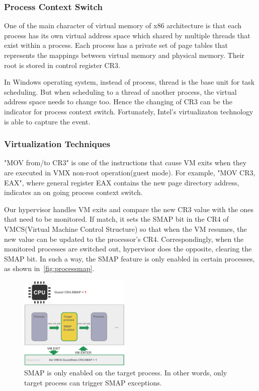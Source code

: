 \subsubsection{Process Context Switch}

One of the main character of virtual memory of x86 architecture is that each process has its own virtual address space which shared by multiple threads that exist within a process. Each process has a private set of page tables that represents the mappings between virtual memory and physical memory. Their root is stored in control register CR3. 

In Windows operating system, instead of process, thread is the base unit for task scheduling. But when scheduling to a thread of another process, the virtual address space needs to change too. Hence the changing of CR3 can be the indicator for process context switch. Fortunately, Intel's virtualizaton technology is able to capture the event.


\subsubsection{Virtualization Techniques}

"MOV from/to CR3" is one of the instructions that cause VM exits when they are executed in VMX non-root operation(guest mode). For example, "MOV CR3, EAX", where general register EAX contains the new page directory address, indicates an on going process context switch.

Our hypervisor handles VM exits and compare the new CR3 value with the ones that need to be monitored. If match, it sets the SMAP bit in the CR4 of VMCS(Virtual Machine Control Structure) so that when the VM resumes, the new value can be updated to the processor's CR4. Correspondingly, when the monitored processes are switched out, hypervisor does the opposite, clearing the SMAP bit. In such a way, the SMAP feature is only enabled in certain processes, as shown in~\autoref{fig:processmap}.

\begin{figure}[th]
  \includegraphics[width=0.47\textwidth]{figures/processmap}
  \centering
  \caption{SMAP is only enabled on the target process. In other words, only target process can trigger SMAP exceptions.}
  \label{fig:processmap}
\end{figure}
